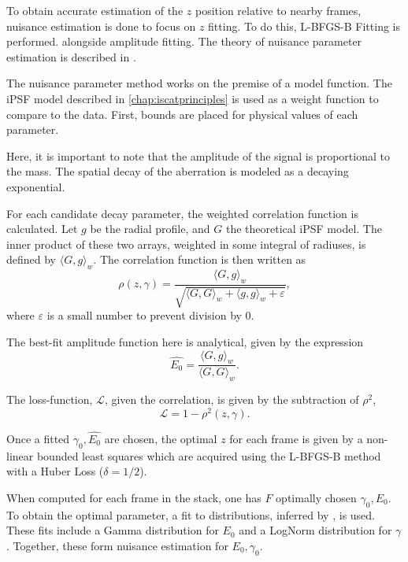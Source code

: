 To obtain accurate estimation of the $z$ position relative to nearby frames, nuisance estimation is done to focus on $z$ fitting. To do this, L-BFGS-B Fitting is performed. alongside amplitude fitting. The theory of nuisance parameter estimation is described in \cite{wasserman2010statistics}.

The nuisance parameter method works on the premise of a model function. The iPSF model described in \ref{chap:iscatprinciples} is used as a weight function to compare to the data. First, bounds are placed for physical values of each parameter.

Here, it is important to note that the amplitude of the signal is proportional to the mass. The spatial decay of the aberration is modeled as a decaying exponential.

For each candidate decay parameter, the weighted correlation function is calculated. Let $g$ be the radial profile, and $G$ the theoretical iPSF model. The inner product of these two arrays, weighted in some integral of radiuses, is defined by $\langle G, g \rangle_w$. The correlation function is then written as
\begin{equation}
    \rho(z, \gamma) = \frac{\langle G, g \rangle_w}{\sqrt{\langle G, G \rangle _w + \langle g, g \rangle_w + \varepsilon}},
\end{equation} 
where $\varepsilon$ is a small number to prevent division by 0. 

The best-fit amplitude function here is analytical, given by the expression
\begin{equation}
    \hat{E_0} = \frac{\langle G, g \rangle_w}{\langle G, G \rangle_w}.
\end{equation}

The loss-function, $\mathcal{L}$, given the correlation, is given by the subtraction of $\rho^2$,
\begin{equation}
    \mathcal{L} = 1-\rho^2(z, \gamma).
\end{equation}

Once a fitted $\gamma_0, \hat{E_0}$ are chosen, the optimal $z$ for each frame is given by a non-linear bounded least squares which are acquired using the L-BFGS-B method with a Huber Loss ($\delta = 1/2$). 

When computed for each frame in the stack, one has $F$ optimally chosen $\gamma_0, E_0$. To obtain the optimal parameter, a fit to distributions, inferred by \cite{dewitPreciseCharacterizationNanometerscale2023}, is used. These fits include a Gamma distribution for $E_0$ and a LogNorm distribution for $\gamma$. Together, these form nuisance estimation for $E_0, \gamma_0$.


